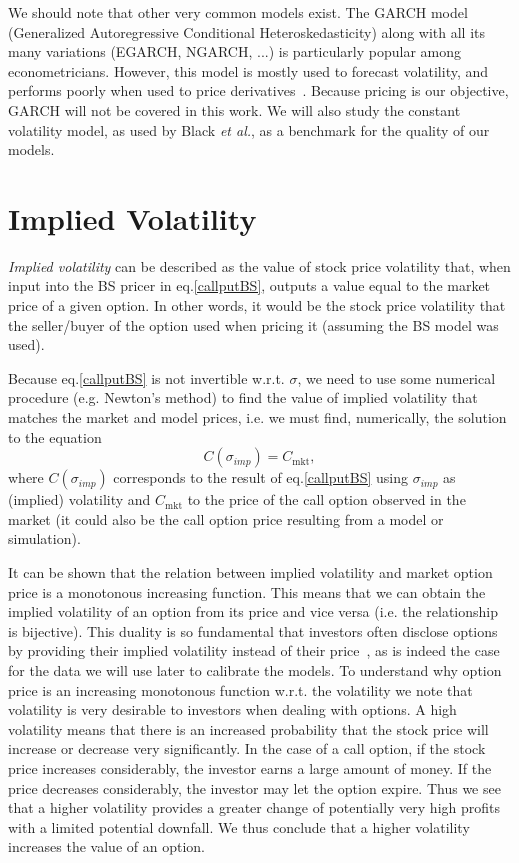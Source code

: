 We should note that other very common models exist. The GARCH model~\citep{bollerslev} (Generalized Autoregressive Conditional Heteroskedasticity) along with all its many variations (EGARCH, NGARCH, ...) is particularly popular among econometricians. However, this model is mostly used to forecast volatility, and performs poorly when used to price derivatives~\citep{chourdakis}. Because pricing is our objective, GARCH will not be covered in this work. We will also study the constant volatility model, as used by Black \textit{et al.}, as a benchmark for the quality of our models.



\section{Implied Volatility}
\label{section:impliedvolatility}
\emph{Implied volatility} can be described as the value of stock price volatility that, when input into the BS pricer in eq.\eqref{callputBS}, outputs a value equal to the market price of a given option.
In other words, it would be the stock price volatility that the seller/buyer of the option used when pricing it (assuming the BS model was used).

Because eq.\eqref{callputBS} is not invertible w.r.t. $\sigma$, we need to use some numerical procedure (e.g. Newton's method) to find the value of implied volatility that matches the market and model prices, i.e. we must find, numerically, the solution to the equation
\begin{equation}\label{impvolform}
C(\sigma_{imp})=C_{\mathrm{mkt}},
\end{equation}
\noindent where $C(\sigma_{imp})$ corresponds to the result of eq.\eqref{callputBS} using $\sigma_{imp}$ as (implied) volatility and $C_{\mathrm{mkt}}$ to the price of the call option observed in the market (it could also be the call option price resulting from a model or simulation).


It can be shown that the relation between implied volatility and market option price is a monotonous increasing function.
This means that we can obtain the implied volatility of an option from its price and vice versa (i.e. the relationship is bijective). This duality is so fundamental that investors often disclose options by providing their implied volatility instead of their price~\citep{Wilmott}, as is indeed the case for the data we will use later to calibrate the models.
To understand why option price is an increasing monotonous function w.r.t. the volatility we note that volatility is very desirable to investors when dealing with options. A high volatility means that there is an increased probability that the stock price will increase or decrease very significantly. In the case of a call option, if the stock price increases considerably, the investor earns a large amount of money. If the price decreases considerably, the investor may let the option expire. Thus we see that a higher volatility provides a greater change of potentially very high profits with a limited potential downfall. We thus conclude that a higher volatility increases the value of an option.



